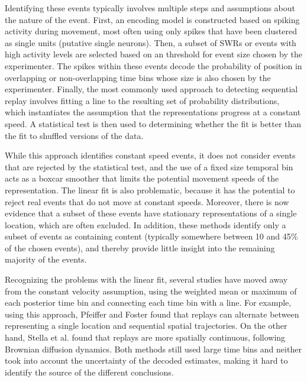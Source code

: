 \documentclass[times, twoside]{zHenriquesLab-StyleBioRxiv}
\begin{document}
Identifying these events typically involves multiple steps and assumptions about the nature of the event. First, an encoding model is constructed based on spiking activity during movement, most often using only spikes that have been clustered as single units (putative single neurons). Then, a subset of SWRs or events with high activity levels are selected based on an threshold for event size chosen by the experimenter. The spikes within these events decode the probability of position in overlapping or non-overlapping time bins whose size is also chosen by the experimenter. Finally, the most commonly used approach to detecting sequential replay involves fitting a line to the resulting set of probability distributions, which instantiates the assumption that the representations progress at a constant speed. A statistical test is then used to determining whether the fit is better than the fit to shuffled versions of the data.

While this approach identifies constant speed events, it does not consider events that are rejected by the statistical test, and the use of a fixed size temporal bin acts as a boxcar smoother that limits the potential movement speeds of the representation. The linear fit is also problematic, because it has the potential to reject real events that do not move at constant speeds. Moreover, there is now evidence that a subset of these events have stationary representations of a single location, which are often excluded. In addition, these methods identify only a subset of events as containing content (typically somewhere between 10 and 45\% of the chosen events), and thereby provide little insight into the remaining majority of the events.

 Recognizing the problems with the linear fit, several studies have moved away from the constant velocity assumption, using the weighted mean or maximum of each posterior time bin and connecting each time bin with a line. For example, using this approach, Pfeiffer and Foster \cite{PfeifferAutoassociativedynamicsgeneration2015} found that replays can alternate between representing a single location and sequential spatial trajectories. On the other hand, Stella et al. \cite{StellaHippocampalReactivationRandom2019} found that replays are more spatially continuous, following Brownian diffusion dynamics. Both methods still used large time bins and neither took into account the uncertainty of the decoded estimates, making it hard to identify the source of the different conclusions.
\end{document}
